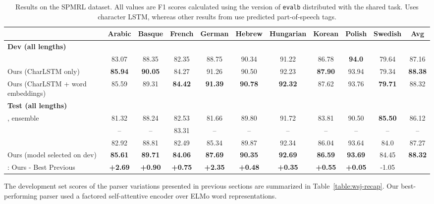 \documentclass[11pt,a4paper]{article}
\begin{document}
\begin{table*}
\centering
\scriptsize
\begin{tabular}{@{}lcccccccccc@{}}
\toprule
  &Arabic &Basque &French &German &Hebrew &Hungarian &Korean &Polish &Swedish &Avg \\
  \midrule
  \textbf{Dev (all lengths)} \\ \addlinespace
\citet{coavoux_multilingual_2017} &
83.07&88.35&82.35&88.75&90.34&91.22&86.78\rlap{}&\textbf{94.0\phantom{0}}&79.64&87.16\\
  Ours (CharLSTM only) & \textbf{85.94} & \textbf{90.05} &84.27&91.26&90.50&92.23&\textbf{87.90}&93.94&79.34& \textbf{88.38} \\
  Ours (CharLSTM + word embeddings) & 85.59 & 89.31 &\textbf{84.42}&\textbf{91.39}&\textbf{90.78}&\textbf{92.32}&87.62&93.76&\textbf{79.71}&   88.32 \\
  \midrule
  \textbf{Test (all lengths)} \\ \addlinespace 
  \citet{bjorkelund_ims-wroclaw-szeged-cis_2014}, ensemble &
81.32\rlap{}&88.24&82.53&81.66&89.80&91.72&83.81&90.50&\textbf{85.50}&86.12 \\
  \citet{cross_span-based_2016} &--&--&83.31&--&--&--&--&--&--&--\\
\citet{coavoux_multilingual_2017} &
82.92\rlap{}&88.81&82.49&85.34&89.87&92.34&86.04&93.64&84.0\phantom{0}&87.27\\
Ours (model selected on dev) &\textbf{85.61}&\textbf{89.71}&\textbf{84.06}&\textbf{87.69}&\textbf{90.35}&\textbf{92.69}&\textbf{86.59}&\textbf{93.69}&84.45&\textbf{88.32}\\ \addlinespace 
  : Ours - Best Previous &\textbf{+2.69}&\textbf{+0.90}&\textbf{+0.75}&\textbf{+2.35}&\textbf{+0.48}&\textbf{+0.35}&\textbf{+0.55}&\textbf{+0.05}&-1.05 \\
  \bottomrule
\end{tabular}
\caption{\label{table:spmrl}Results on the SPMRL dataset. All values are F1 scores calculated using the version of \texttt{evalb} distributed with the shared task. \citet{bjorkelund_re_2013} Uses character LSTM, whereas other results from \citet{coavoux_multilingual_2017} use predicted part-of-speech tags.}
\end{table*}

The development set scores of the parser variations presented in previous sections are summarized in Table~\ref{table:wsj-recap}. Our best-performing parser used a factored self-attentive encoder over ELMo word representations.
\end{document}
